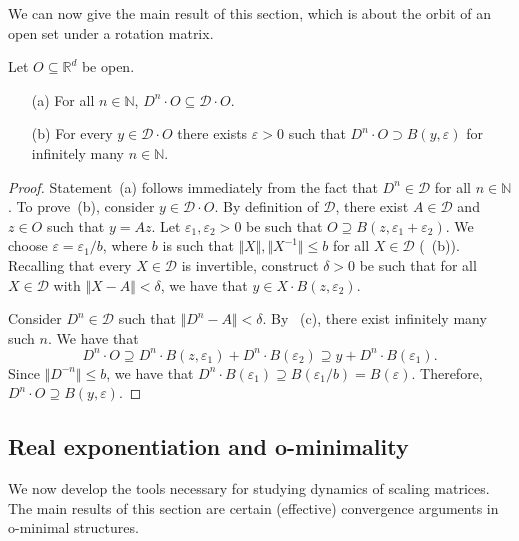 \documentclass[a4paper,UKenglish,cleveref]{lipics-v2021}
\newcommand{\nat}{\mathbb{N}}
\newcommand{\rel}{\mathbb{R}}
\newcommand{\Dcal}{\mathcal{D}}
\begin{document}
We can now give the main result of this section, which is about the orbit of an open set under a rotation matrix.

\begin{lemma}
	\label{thm:rotation-with-open sets}
	Let $O \subseteq \rel^d$ be open.
	\begin{itemize}
		\item[(a)] For all $n \in \nat$, $D^n \cdot O \subseteq \Dcal \cdot O$.
		\item[(b)] For every $y \in \Dcal \cdot O$ there exists $\varepsilon>0$ such that $D^n \cdot O \supset B(y, \varepsilon)$ for infinitely many $n \in \nat$.
	\end{itemize}
\end{lemma}
\begin{proof}
	Statement~(a) follows immediately from the fact that $D^n \in \Dcal$ for all $n \in \nat$.
	To prove~(b), consider $y \in \Dcal \cdot O$.
	By definition of $\Dcal$, there exist $A \in \Dcal$ and $z \in O$ such that $y = Az$.
	Let $\varepsilon_1,\varepsilon_2 > 0$ be such that $O \supseteq B(z, \varepsilon_1+\varepsilon_2)$.
	We choose $\varepsilon = \varepsilon_1 / b$, where $b$ is such that $\Vert  X \Vert, \Vert X^{-1} \Vert  \le b$ for all $X \in \Dcal$ (~(b)).
Recalling that every $X \in \Dcal$ is invertible, construct $\delta > 0$ be such that for all $X \in \Dcal$ with $\Vert X - A \Vert < \delta$, we have that $ y\in X \cdot B(z, \varepsilon_2)$.
	
	Consider $D^n \in \Dcal$ such that $\Vert D^n - A \Vert < \delta$.
	By ~(c), there exist infinitely many such $n$.
	We have that
	\[
	D^n \cdot O \supseteq D^n \cdot B(z,\varepsilon_1) + D^n \cdot B(\varepsilon_2)
	\supseteq y + D^n \cdot B(\varepsilon_1).
	\]
	Since $\Vert D^{-n} \Vert \le b$, we have that $D^n \cdot B(\varepsilon_1) \supseteq B(\varepsilon_1/b) = B(\varepsilon)$.
	Therefore, $D^n \cdot O  \supseteq B(y,\varepsilon)$.
\end{proof}


\subsection{Real exponentiation and o-minimality}
\label{sec:omin}

We now develop the tools necessary for studying dynamics of scaling matrices.
The main results of this section are certain (effective) convergence arguments in o-minimal structures.
\end{document}
